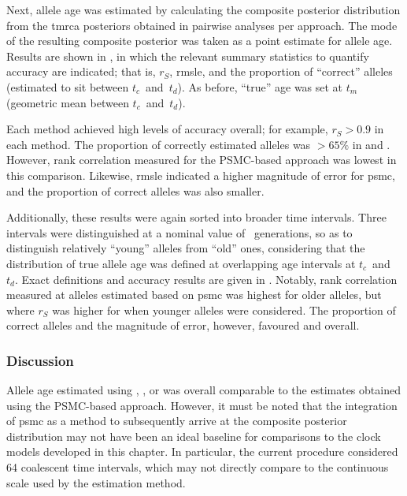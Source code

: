 Next, allele age was estimated by calculating the composite posterior distribution from the \gls{tmrca} posteriors obtained in pairwise analyses per approach.
The mode of the resulting composite posterior was taken as a point estimate for allele age.
Results are shown in , in which the relevant summary statistics to quantify accuracy are indicated; that is, $r_S$, \gls{rmsle}, and the proportion of ``correct'' alleles (estimated to sit between $t_c$~and~$t_d$).
As before, ``true'' age was set at $t_m$ (geometric mean between $t_c$~and~$t_d$).

%

%

Each method achieved high levels of accuracy overall; for example, ${r_S>0.9}$ in each method.
The proportion of correctly estimated alleles was $>65\%$ in \ClockR and \ClockC.
However, rank correlation measured for the PSMC-based approach was lowest in this comparison.
Likewise, \gls{rmsle} indicated a higher magnitude of error for \gls{psmc}, and the proportion of correct alleles was also smaller.

Additionally, these results were again sorted into broader time intervals.
Three intervals were distinguished at a nominal value of ~generations, so as to distinguish relatively ``young'' alleles from ``old'' ones, considering that the distribution of true allele age was defined at overlapping age intervals at $t_c$~and~$t_d$.
Exact definitions and accuracy results are given in .
Notably, rank correlation measured at alleles estimated based on \gls{psmc} was highest for older alleles, but where $r_S$ was higher for \ClockM when younger alleles were considered.
The proportion of correct alleles and the magnitude of error, however, favoured \ClockR and \ClockC overall.

%

%


%
\subsubsection{Discussion}
%

Allele age estimated using \ClockM, \ClockR, or \ClockC was overall comparable to the estimates obtained using the PSMC-based approach.
However, it must be noted that the integration of \gls{psmc} as a method to subsequently arrive at the composite posterior distribution may not have been an ideal baseline for comparisons to the clock models developed in this chapter.
In particular, the current procedure considered 64 coalescent time intervals, which may not directly compare to the continuous scale used by the estimation method.

